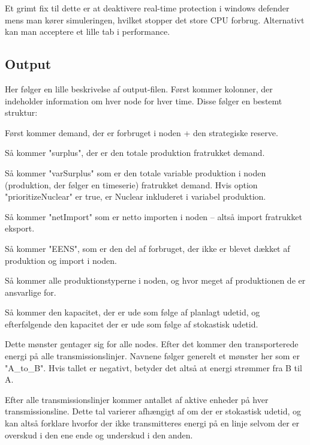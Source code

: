 \documentclass{article}
\begin{document}
Et grimt fix til dette er at deaktivere real-time protection i windows defender mens man kører simuleringen, hvilket stopper det store CPU forbrug. Alternativt kan man acceptere et lille tab i performance. 

\subsection{Output}
Her følger en lille beskrivelse af output-filen. Først kommer kolonner, der indeholder information om hver node for hver time. Disse følger en bestemt struktur:

Først kommer demand, der er forbruget i noden + den strategiske reserve.

Så kommer "surplus", der er den totale produktion fratrukket demand. 

Så kommer "varSurplus" som er den totale variable produktion i noden (produktion, der følger en timeserie) fratrukket demand. Hvis option "prioritizeNuclear" er true, er Nuclear inkluderet i variabel produktion.

Så kommer "netImport" som er netto importen i noden -- altså import fratrukket eksport. 

Så kommer "EENS", som er den del af forbruget, der ikke er blevet dækket af produktion og import i noden. 

Så kommer alle produktionstyperne i noden, og hvor meget af produktionen de er ansvarlige for.

Så kommer den kapacitet, der er ude som følge af planlagt udetid, og efterfølgende den kapacitet der er ude som følge af stokastisk udetid. 

Dette mønster gentager sig for alle nodes. Efter det kommer den transporterede energi på alle transmissionslinjer. Navnene følger generelt et mønster her som er "A\_to\_B". Hvis tallet er negativt, betyder det altså at energi strømmer fra B til A. 

Efter alle transmissionslinjer kommer antallet af aktive enheder på hver transmissionsline. Dette tal varierer afhængigt af om der er stokastisk udetid, og kan altså forklare hvorfor der ikke transmitteres energi på en linje selvom der er overskud i den ene ende og underskud i den anden. 
\end{document}
